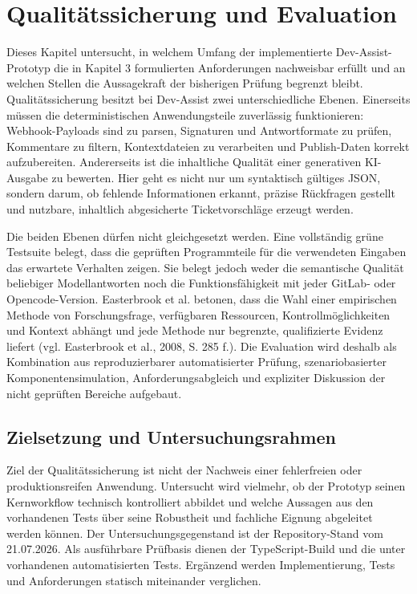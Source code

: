 \chapter{Qualitätssicherung und Evaluation}

Dieses Kapitel untersucht, in welchem Umfang der implementierte Dev-Assist-Prototyp die in Kapitel 3 formulierten Anforderungen nachweisbar erfüllt und an welchen Stellen die Aussagekraft der bisherigen Prüfung begrenzt bleibt. Qualitätssicherung besitzt bei Dev-Assist zwei unterschiedliche Ebenen. Einerseits müssen die deterministischen Anwendungsteile zuverlässig funktionieren: Webhook-Payloads sind zu parsen, Signaturen und Antwortformate zu prüfen, Kommentare zu filtern, Kontextdateien zu verarbeiten und Publish-Daten korrekt aufzubereiten. Andererseits ist die inhaltliche Qualität einer generativen KI-Ausgabe zu bewerten. Hier geht es nicht nur um syntaktisch gültiges JSON, sondern darum, ob fehlende Informationen erkannt, präzise Rückfragen gestellt und nutzbare, inhaltlich abgesicherte Ticketvorschläge erzeugt werden.

Die beiden Ebenen dürfen nicht gleichgesetzt werden. Eine vollständig grüne Testsuite belegt, dass die geprüften Programmteile für die verwendeten Eingaben das erwartete Verhalten zeigen. Sie belegt jedoch weder die semantische Qualität beliebiger Modellantworten noch die Funktionsfähigkeit mit jeder GitLab- oder Opencode-Version. Easterbrook et al. betonen, dass die Wahl einer empirischen Methode von Forschungsfrage, verfügbaren Ressourcen, Kontrollmöglichkeiten und Kontext abhängt und jede Methode nur begrenzte, qualifizierte Evidenz liefert (vgl. Easterbrook et al., 2008, S. 285 f.). Die Evaluation wird deshalb als Kombination aus reproduzierbarer automatisierter Prüfung, szenariobasierter Komponentensimulation, Anforderungsabgleich und expliziter Diskussion der nicht geprüften Bereiche aufgebaut.

\section{Zielsetzung und Untersuchungsrahmen}

Ziel der Qualitätssicherung ist nicht der Nachweis einer fehlerfreien oder produktionsreifen Anwendung. Untersucht wird vielmehr, ob der Prototyp seinen Kernworkflow technisch kontrolliert abbildet und welche Aussagen aus den vorhandenen Tests über seine Robustheit und fachliche Eignung abgeleitet werden können. Der Untersuchungsgegenstand ist der Repository-Stand vom 21.07.2026. Als ausführbare Prüfbasis dienen der TypeScript-Build und die unter  vorhandenen automatisierten Tests. Ergänzend werden Implementierung, Tests und Anforderungen statisch miteinander verglichen.

